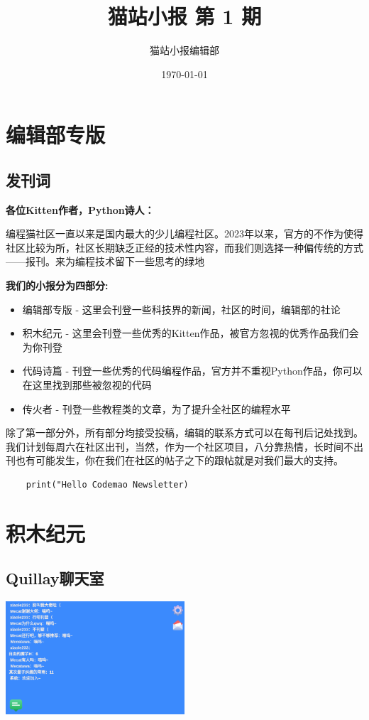 \documentclass[UTF8,fontset=fandol]{article}
\title{猫站小报 第 1 期}
\author{猫站小报编辑部}
\date{\today}
\begin{document}
\maketitle
\section{编辑部专版}
\subsection{发刊词}

\noindent
\textbf{各位Kitten作者，Python诗人：} 

编程猫社区一直以来是国内最大的少儿编程社区。2023年以来，官方的不作为使得社区比较为所，社区长期缺乏正经的技术性内容，而我们则选择一种偏传统的方式——报刊。来为编程技术留下一些思考的绿地

\noindent
\textbf{我们的小报分为四部分:}

\begin{itemize}
\item 编辑部专版 - 这里会刊登一些科技界的新闻，社区的时间，编辑部的社论
\item 积木纪元 - 这里会刊登一些优秀的Kitten作品，被官方忽视的优秀作品我们会为你刊登
\item 代码诗篇 - 刊登一些优秀的代码编程作品，官方并不重视Python作品，你可以在这里找到那些被忽视的代码
\item 传火者 - 刊登一些教程类的文章，为了提升全社区的编程水平
\end{itemize}

除了第一部分外，所有部分均接受投稿，编辑的联系方式可以在每刊后记处找到。我们计划每周六在社区出刊，当然，作为一个社区项目，八分靠热情，长时间不出刊也有可能发生，你在我们在社区的帖子之下的跟帖就是对我们最大的支持。

\begin{verbatim}
	print("Hello Codemao Newsletter)
\end{verbatim}
\pagebreak

\section{积木纪元}
\subsection{Quillay聊天室}
\includegraphics[width=0.5\textwidth]{assets/01/kitten-1.png}
\end{document}
